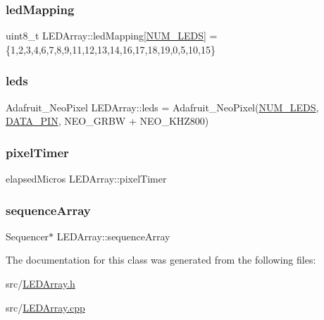 \subsubsection{\texorpdfstring{led\+Mapping}{ledMapping}}
{\footnotesize\ttfamily uint8\+\_\+t L\+E\+D\+Array\+::led\+Mapping\mbox{[}\hyperlink{_l_e_d_array_8h_a4c4ae9a4146ce8d6a5debc90300d9abd}{N\+U\+M\+\_\+\+L\+E\+DS}\mbox{]} = \{1,2,3,4,6,7,8,9,11,12,13,14,16,17,18,19,0,5,10,15\}\hspace{0.3cm}{\ttfamily [private]}}

\mbox{\label{class_l_e_d_array_ae781b0d4364e6789f618e9d73fe69198}} 
\subsubsection{\texorpdfstring{leds}{leds}}
{\footnotesize\ttfamily Adafruit\+\_\+\+Neo\+Pixel L\+E\+D\+Array\+::leds = Adafruit\+\_\+\+Neo\+Pixel(\hyperlink{_l_e_d_array_8h_a4c4ae9a4146ce8d6a5debc90300d9abd}{N\+U\+M\+\_\+\+L\+E\+DS}, \hyperlink{_l_e_d_array_8h_adad67fe595ea440c8f8247ec2cddf070}{D\+A\+T\+A\+\_\+\+P\+IN}, N\+E\+O\+\_\+\+G\+R\+BW + N\+E\+O\+\_\+\+K\+H\+Z800)\hspace{0.3cm}{\ttfamily [private]}}

\mbox{\label{class_l_e_d_array_a72681582a31026c79a8021cead72d51e}} 
\subsubsection{\texorpdfstring{pixel\+Timer}{pixelTimer}}
{\footnotesize\ttfamily elapsed\+Micros L\+E\+D\+Array\+::pixel\+Timer\hspace{0.3cm}{\ttfamily [private]}}

\mbox{\label{class_l_e_d_array_a93c18ec03393f639c7e0a11a3324c922}} 
\subsubsection{\texorpdfstring{sequence\+Array}{sequenceArray}}
{\footnotesize\ttfamily Sequencer$\ast$ L\+E\+D\+Array\+::sequence\+Array\hspace{0.3cm}{\ttfamily [private]}}



The documentation for this class was generated from the following files\+:\begin{DoxyCompactItemize}
\item 
src/\hyperlink{_l_e_d_array_8h}{L\+E\+D\+Array.\+h}\item 
src/\hyperlink{_l_e_d_array_8cpp}{L\+E\+D\+Array.\+cpp}\end{DoxyCompactItemize}
